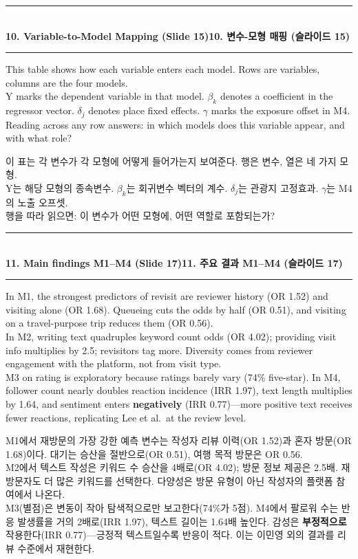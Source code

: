 \documentclass[10pt,a4paper]{article}
\newcommand{\sechead}[2]{%
  \vspace{6pt}%
  \noindent\rule{\linewidth}{0.6pt}\\[1pt]
  {\small\bfseries #1\hfill #2}\\[-3pt]
  \rule{\linewidth}{0.4pt}\par\vspace{2pt}%
}
\newcommand{\sent}[1]{#1\\[5pt]}
\newcommand{\bilingual}[2]{%
  \noindent%
  \begin{minipage}[t]{0.485\linewidth}
    \small #1
  \end{minipage}\hfill\vrule\hfill%
  \begin{minipage}[t]{0.483\linewidth}
    \small #2
  \end{minipage}\par\vspace{4pt}%
}
\begin{document}
\sechead{10. Variable-to-Model Mapping (Slide 15)}{10. 변수-모형 매핑 (슬라이드 15)}
\bilingual{%
  \sent{This table shows how each variable enters each model. Rows are variables, columns are the four models.}
  \sent{Y marks the dependent variable in that model. $\beta_k$ denotes a coefficient in the regressor vector. $\delta_j$ denotes place fixed effects. $\gamma$ marks the exposure offset in M4.}
  \sent{Reading across any row answers: in which models does this variable appear, and with what role?}
}{%
  \sent{이 표는 각 변수가 각 모형에 어떻게 들어가는지 보여준다. 행은 변수, 열은 네 가지 모형.}
  \sent{Y는 해당 모형의 종속변수. $\beta_k$는 회귀변수 벡터의 계수. $\delta_j$는 관광지 고정효과. $\gamma$는 M4의 노출 오프셋.}
  \sent{행을 따라 읽으면: 이 변수가 어떤 모형에, 어떤 역할로 포함되는가?}
}

\sechead{11. Main findings M1--M4 (Slide 17)}{11. 주요 결과 M1--M4 (슬라이드 17)}
\bilingual{%
  \sent{In M1, the strongest predictors of revisit are reviewer history (OR 1.52) and visiting alone (OR 1.68). Queueing cuts the odds by half (OR 0.51), and visiting on a travel-purpose trip reduces them (OR 0.56).}
  \sent{In M2, writing text quadruples keyword count odds (OR 4.02); providing visit info multiplies by 2.5; revisitors tag more. Diversity comes from reviewer engagement with the platform, not from visit type.}
  \sent{M3 on rating is exploratory because ratings barely vary (74\% five-star). In M4, follower count nearly doubles reaction incidence (IRR 1.97), text length multiplies by 1.64, and sentiment enters \textbf{negatively} (IRR 0.77)---more positive text receives fewer reactions, replicating Lee et al.\ at the review level.}
}{%
  \sent{M1에서 재방문의 가장 강한 예측 변수는 작성자 리뷰 이력(OR 1.52)과 혼자 방문(OR 1.68)이다. 대기는 승산을 절반으로(OR 0.51), 여행 목적 방문은 OR 0.56.}
  \sent{M2에서 텍스트 작성은 키워드 수 승산을 4배로(OR 4.02); 방문 정보 제공은 2.5배. 재방문자도 더 많은 키워드를 선택한다. 다양성은 방문 유형이 아닌 작성자의 플랫폼 참여에서 나온다.}
  \sent{M3(별점)은 변동이 작아 탐색적으로만 보고한다(74\%가 5점). M4에서 팔로워 수는 반응 발생률을 거의 2배로(IRR 1.97), 텍스트 길이는 1.64배 높인다. 감성은 \textbf{부정적으로} 작용한다(IRR 0.77)---긍정적 텍스트일수록 반응이 적다. 이는 이민영 외의 결과를 리뷰 수준에서 재현한다.}
}
\end{document}
